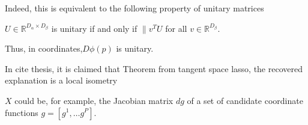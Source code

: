 Indeed, this is equivalent to the following property of unitary matrices

\begin{proposition}
\label{prop:unitary_spectrum}
$U \in \mathbb{R}^{D_\alpha \times D_\beta}$ is unitary if and only if $\| v^T  U$ for all $v \in \mathbb R^{D_\beta}$.
\end{proposition}

Thus, in coordinates,$D \phi (p)$ is unitary.

In cite thesis, it is claimed that Theorem from tangent space lasso, the recovered explanation is a local isometry

$X$ could be, for example, the Jacobian matrix $d g$ of a set of candidate coordinate functions $g = [g^1, \dotsc g^P]$.

